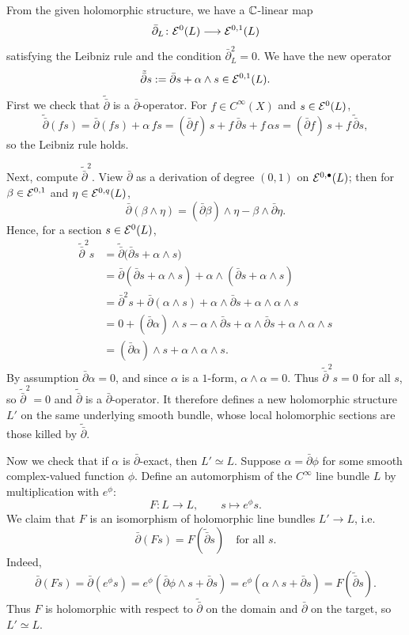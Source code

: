 \documentclass[12pt]{article}
\begin{document}
\begin{solution}
From the given holomorphic structure, we have a $\mathbb{C}$-linear map
\[
\bar\partial_L\colon {\mathcal{E}}^0(L)\longrightarrow{\mathcal{E}}^{0,1}(L)
\]
satisfying the Leibniz rule and the condition
$\bar\partial_L^2=0$.
We have the new operator
\[
\tilde{\bar\partial}s := \bar\partial s + \alpha\wedge s
\in{\mathcal{E}}^{0,1}(L).
\]
First we check that $\tilde{\bar\partial}$ is a $\bar\partial$-operator.
For $f\in C^\infty(X)$ and $s\in{\mathcal{E}}^0(L)$,
\[
\tilde{\bar\partial}(fs)
= \bar\partial(fs) + \alpha\,fs
= (\bar\partial f)\,s + f\,\bar\partial s + f\,\alpha s
= (\bar\partial f)\,s + f\,\tilde{\bar\partial}s,
\]
so the Leibniz rule holds.

Next, compute $\tilde{\bar\partial}^2$.  View $\bar\partial$ as a
derivation of degree $(0,1)$ on ${\mathcal{E}}^{0,\bullet}(L)$; then for
$\beta\in{\mathcal{E}}^{0,1}$ and $\eta\in{\mathcal{E}}^{0,q}(L)$,
\[
\bar\partial(\beta\wedge\eta)
= (\bar\partial\beta)\wedge\eta - \beta\wedge\bar\partial\eta.
\]
Hence, for a section $s\in{\mathcal{E}}^0(L)$,
\begin{align*}
\tilde{\bar\partial}^2 s
&= \tilde{\bar\partial}\bigl(\bar\partial s + \alpha \wedge s\bigr) \\
&= \bar\partial(\bar\partial s + \alpha \wedge s)
   + \alpha\wedge(\bar\partial s + \alpha \wedge s) \\
&= \bar\partial^2 s
   + \bar\partial(\alpha \wedge s)
   + \alpha\wedge\bar\partial s
   + \alpha\wedge\alpha \wedge s \\
&= 0 + (\bar\partial\alpha)\wedge s - \alpha\wedge\bar\partial s
   + \alpha\wedge\bar\partial s + \alpha\wedge\alpha \wedge s \\
&= (\bar\partial\alpha)\wedge s + \alpha\wedge\alpha \wedge s.
\end{align*}
By assumption $\bar\partial\alpha=0$, and since $\alpha$ is a $1$-form,
$\alpha\wedge\alpha=0$.  Thus $\tilde{\bar\partial}^2s=0$ for all $s$,
so $\tilde{\bar\partial}^2=0$ and $\tilde{\bar\partial}$ is a
$\bar\partial$-operator.  It therefore defines a new holomorphic
structure $L'$ on the same underlying smooth bundle, whose local
holomorphic sections are those killed by $\tilde{\bar\partial}$.

Now we check that if $\alpha$ is $\bar\partial$-exact, then $L'\simeq L$.
Suppose $\alpha=\bar\partial\phi$ for some smooth complex-valued
function $\phi$.  Define an automorphism of the \(C^\infty\) line bundle
$L$ by multiplication with $e^\phi$:
\[
F\colon L\longrightarrow L,\qquad s\longmapsto e^\phi s.
\]
We claim that $F$ is an isomorphism of holomorphic line bundles
$L'\to L$, i.e.
\[
\bar\partial(Fs) = F(\tilde{\bar\partial}s)
\quad\text{for all }s.
\]
Indeed,
\[
\bar\partial(Fs)
= \bar\partial(e^\phi s)
= e^\phi(\bar\partial\phi\wedge s + \bar\partial s)
= e^\phi(\alpha\wedge s + \bar\partial s)
= F(\tilde{\bar\partial}s).
\]
Thus $F$ is holomorphic with respect to $\tilde{\bar\partial}$ on the
domain and $\bar\partial$ on the target, so $L'\simeq L$.


\end{solution}
\end{document}
